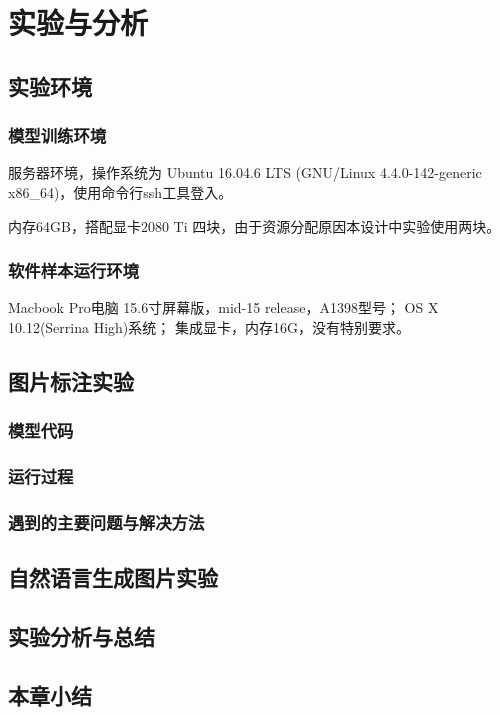 
\chapter{实验与分析}
\section{实验环境}
\subsection{模型训练环境}
服务器环境，操作系统为
Ubuntu 16.04.6 LTS (GNU/Linux 4.4.0-142-generic x86\_64)，使用命令行ssh工具登入。

内存64GB，搭配显卡2080 Ti 四块，由于资源分配原因本设计中实验使用两块。

\subsection{软件样本运行环境}
Macbook Pro电脑 15.6寸屏幕版，mid-15 release，A1398型号；
OS X 10.12(Serrina High)系统；
集成显卡，内存16G，没有特别要求。

\section{图片标注实验}
\subsection{模型代码}

\subsection{运行过程}

\subsection{遇到的主要问题与解决方法}

\section{自然语言生成图片实验}

\section{实验分析与总结}

\section{本章小结}




